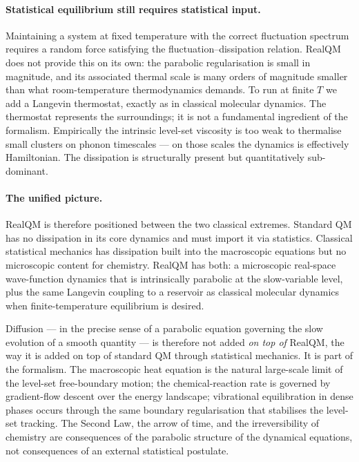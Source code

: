 \documentclass[11pt]{article}
\begin{document}
\paragraph{Statistical equilibrium still requires statistical input.}
Maintaining a system at fixed temperature with the correct fluctuation spectrum requires a random force satisfying the fluctuation--dissipation relation. RealQM does not provide this on its own: the parabolic regularisation is small in magnitude, and its associated thermal scale is many orders of magnitude smaller than what room-temperature thermodynamics demands. To run at finite $T$ we add a Langevin thermostat, exactly as in classical molecular dynamics. The thermostat represents the surroundings; it is not a fundamental ingredient of the formalism. Empirically the intrinsic level-set viscosity is too weak to thermalise small clusters on phonon timescales --- on those scales the dynamics is effectively Hamiltonian. The dissipation is structurally present but quantitatively sub-dominant.

\paragraph{The unified picture.}
RealQM is therefore positioned between the two classical extremes. Standard QM has no dissipation in its core dynamics and must import it via statistics. Classical statistical mechanics has dissipation built into the macroscopic equations but no microscopic content for chemistry. RealQM has both: a microscopic real-space wave-function dynamics that is intrinsically parabolic at the slow-variable level, plus the same Langevin coupling to a reservoir as classical molecular dynamics when finite-temperature equilibrium is desired.

Diffusion --- in the precise sense of a parabolic equation governing the slow evolution of a smooth quantity --- is therefore not added \emph{on top of} RealQM, the way it is added on top of standard QM through statistical mechanics. It is part of the formalism. The macroscopic heat equation is the natural large-scale limit of the level-set free-boundary motion; the chemical-reaction rate is governed by gradient-flow descent over the energy landscape; vibrational equilibration in dense phases occurs through the same boundary regularisation that stabilises the level-set tracking. The Second Law, the arrow of time, and the irreversibility of chemistry are consequences of the parabolic structure of the dynamical equations, not consequences of an external statistical postulate.
\end{document}

